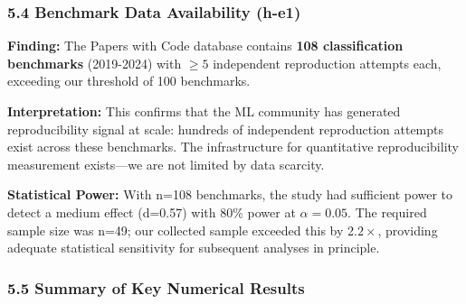 \subsubsection{5.4 Benchmark Data Availability (h-e1)}

\textbf{Finding:} The Papers with Code database contains \textbf{108 classification benchmarks} (2019-2024) with $\geq 5$ independent reproduction attempts each, exceeding our threshold of 100 benchmarks.

\textbf{Interpretation:} This confirms that the ML community has generated reproducibility signal at scale: hundreds of independent reproduction attempts exist across these benchmarks. The infrastructure for quantitative reproducibility measurement exists---we are not limited by data scarcity.

\textbf{Statistical Power:} With n=108 benchmarks, the study had sufficient power to detect a medium effect (d=0.57) with 80\% power at $\alpha =0.05$. The required sample size was n=49; our collected sample exceeded this by 2.$2\times$, providing adequate statistical sensitivity for subsequent analyses in principle.

\subsubsection{5.5 Summary of Key Numerical Results}

\begin{table}[htbp]
\centering
{}
\end{table}

